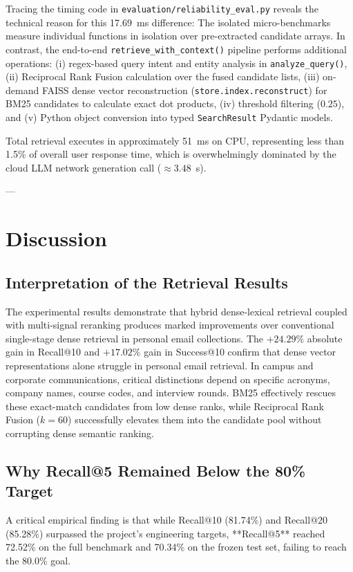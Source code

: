 \documentclass[11pt,a4paper]{article}
\begin{document}
Tracing the timing code in \texttt{evaluation/reliability\_eval.py} reveals the technical reason for this 17.69~ms difference:
The isolated micro-benchmarks measure individual functions in isolation over pre-extracted candidate arrays. In contrast, the end-to-end \texttt{retrieve\_with\_context()} pipeline performs additional operations: (i) regex-based query intent and entity analysis in \texttt{analyze\_query()}, (ii) Reciprocal Rank Fusion calculation over the fused candidate lists, (iii) on-demand FAISS dense vector reconstruction (\texttt{store.index.reconstruct}) for BM25 candidates to calculate exact dot products, (iv) threshold filtering ($0.25$), and (v) Python object conversion into typed \texttt{SearchResult} Pydantic models. 

Total retrieval executes in approximately 51~ms on CPU, representing less than 1.5\% of overall user response time, which is overwhelmingly dominated by the cloud LLM network generation call ($\approx 3.48$~s).

---

\section{Discussion}

\subsection{Interpretation of the Retrieval Results}
The experimental results demonstrate that hybrid dense-lexical retrieval coupled with multi-signal reranking produces marked improvements over conventional single-stage dense retrieval in personal email collections. The $+24.29\%$ absolute gain in Recall@10 and $+17.02\%$ gain in Success@10 confirm that dense vector representations alone struggle in personal email retrieval. In campus and corporate communications, critical distinctions depend on specific acronyms, company names, course codes, and interview rounds. BM25 effectively rescues these exact-match candidates from low dense ranks, while Reciprocal Rank Fusion ($k=60$) successfully elevates them into the candidate pool without corrupting dense semantic ranking.

\subsection{Why Recall@5 Remained Below the 80\% Target}
A critical empirical finding is that while Recall@10 (81.74\%) and Recall@20 (85.28\%) surpassed the project's engineering targets, **Recall@5** reached 72.52\% on the full benchmark and 70.34\% on the frozen test set, failing to reach the 80.0\% goal. 
\end{document}
